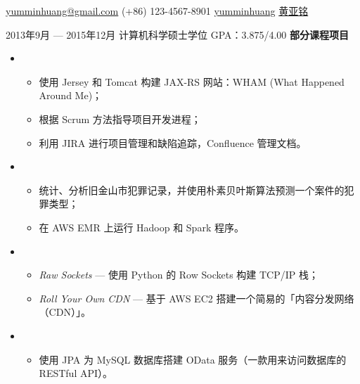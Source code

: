 \documentclass{newresume}
\begin{document}
{\href{mailto:yumminhuang@gmail.com}{yumminhuang@gmail.com}}
{(+86) 123-4567-8901}
{\href{https://github.com/yumminhuang}{yumminhuang}}
{\href{https://www.linkedin.com/in/yaming-huang-6a09325b/zh-cn}{黄亚铭}}
{}


\begin{body}
	{2013年9月 --- 2015年12月}
	{计算机科学硕士学位}
	{GPA：3.875/4.00}
	\textbf{部分课程项目}
	\begin{itemize}
	\item {}
	\begin{itemize}
		\item 使用 Jersey 和 Tomcat 构建 JAX-RS 网站：WHAM (What Happened Around Me)；
		\item 根据 Scrum 方法指导项目开发进程；
		\item 利用 JIRA 进行项目管理和缺陷追踪，Confluence 管理文档。
	\end{itemize}

	\item {}
	\begin{itemize}
		\item 统计、分析旧金山市犯罪记录，并使用朴素贝叶斯算法预测一个案件的犯罪类型；
		\item 在 AWS EMR 上运行 Hadoop 和 Spark 程序。
	\end{itemize}

	\item {}
	\begin{itemize}
		\item \textit{Raw Sockets} --- 使用 Python 的 Row Sockets 构建 TCP/IP 栈；
		\item \textit{Roll Your Own CDN} --- 基于 AWS EC2 搭建一个简易的「内容分发网络（CDN）」。
	\end{itemize}

	\item {}
	\begin{itemize}
		\item 使用 JPA 为 MySQL 数据库搭建 OData 服务（一款用来访问数据库的 RESTful API）。
	\end{itemize}


\end{itemize}
\end{body}
\end{document}
